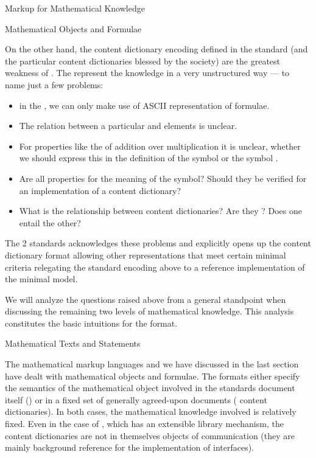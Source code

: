 \begin{omgroup}[id=math-markup]{Markup for Mathematical Knowledge}
\begin{omgroup}[id=math-objects]{Mathematical Objects and Formulae}
\begin{omgroup}[id=math-markup:openmath]{\openmath}
  On the other hand, the content dictionary encoding defined in the {\openmath} standard
  (and the particular content dictionaries blessed by the {\openmath} society) are the
  greatest weakness of {\openmath}.  The represent the knowledge in a very unstructured
  way --- to name just a few problems:
  \begin{itemize}
  \item in the {}, we can only make use of ASCII representation
    of formulae.
  \item The relation between a particular {} and
    {} elements is unclear.
  \item For properties like the {} of addition over
    multiplication it is unclear, whether we should express this in the definition of the
    symbol {} or the symbol {}.
  \item Are all properties {} for the meaning of
    the symbol? Should they be verified for an implementation of a content dictionary?
  \item What is the relationship between content dictionaries? Are they
    {}?  Does one entail the other?
  \end{itemize}
  The {\openmath}2 standards acknowledges these problems and explicitly opens up the
  content dictionary format allowing other representations that meet certain minimal
  criteria relegating the standard encoding above to a reference implementation of the
  minimal model.

  We will analyze the questions raised above from a general standpoint when discussing the
  remaining two levels of mathematical knowledge. This analysis constitutes the basic
  intuitions for the {\omdoc} format.
\end{omgroup}
\end{omgroup}

\begin{omgroup}[id=meta-math]{Mathematical Texts and Statements}

  The mathematical markup languages {\openmath} and {\mathml} we have discussed in the
  last section have dealt with mathematical objects and formulae. The formats either
  specify the semantics of the mathematical object involved in the standards document
  itself ({\mathml}) or in a fixed set of generally agreed-upon documents ({\openmath}
  content dictionaries). In both cases, the mathematical
  knowledge involved is relatively fixed. Even in the case of {\openmath}, which has an
  extensible library mechanism, the content dictionaries are not in themselves objects of
  communication (they are mainly background reference for the implementation of
  {\openmath} interfaces).


\end{omgroup}
\end{omgroup}
